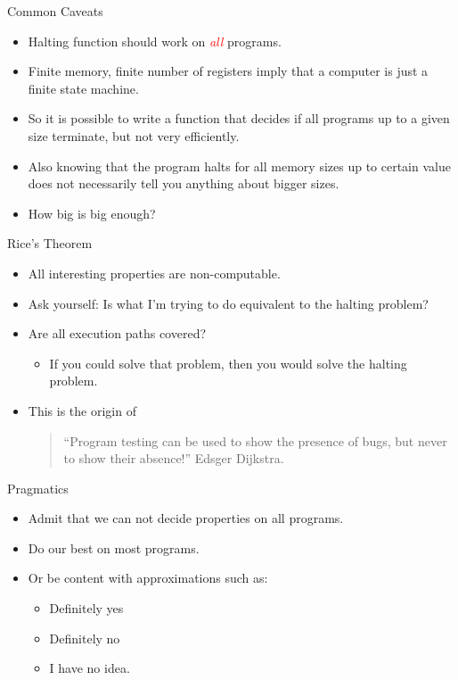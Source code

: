 \documentclass[handout]{beamer}
\begin{document}
\begin{frame}{Common Caveats}
  \begin{itemize}
  \item Halting function should work on \textcolor{red}{\em all} programs.
  \item Finite memory, finite number of registers imply that a computer is just a
    finite state machine.
  \item So it is possible to write a function that decides if all
    programs up to a given size terminate, but not very efficiently.
  \item Also knowing that the program halts for all memory sizes up to
    certain value does not necessarily tell you anything about bigger
    sizes. 
\item How big is big enough? 
  \end{itemize}
\end{frame}
\begin{frame}{Rice's Theorem}
  \begin{itemize}
  \item All interesting properties are non-computable. 
  \item Ask yourself: Is what I'm trying to do equivalent to the
    halting problem?
    \item Are all execution paths covered?
      \begin{itemize}
      \item  If you could solve that problem, then you would solve the
        halting problem.
      \end{itemize}
    \item This is the origin of 
  \begin{quote}
    ``Program testing can be used to show the presence of bugs, but
    never to show their absence!'' Edsger Dijkstra.
  \end{quote}
  \end{itemize}
\end{frame}
\begin{frame}{Pragmatics}
  \begin{itemize}
  \item Admit that we can not decide properties on all programs.
  \item Do our best on most programs.
  \item Or be content with approximations such as: 
    \begin{itemize}
    \item Definitely yes
    \item Definitely no
    \item I have no idea.
    \end{itemize}
  \end{itemize}
\end{frame}
\end{document}
